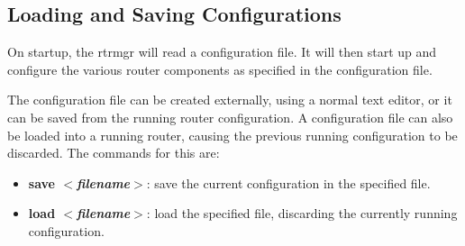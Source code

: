 \documentclass[11pt]{article}
\begin{document}
\noindent{}

\subsection{Loading and Saving Configurations}

On startup, the rtrmgr will read a configuration file.  It will then
start up and configure the various router components as specified in
the configuration file.

The configuration file can be created externally, using a normal text
editor, or it can be saved from the running router configuration.  A
configuration file can also be loaded into a running router, causing
the previous running configuration to be discarded.  The commands for
this are:
\begin{itemize}
\item \textbf{save $<$\textit{filename}$>$}: save the current
configuration in the specified file.
\item \textbf{load $<$\textit{filename}$>$}: load the specified file,
discarding the currently running configuration.
\end{itemize}
\end{document}
